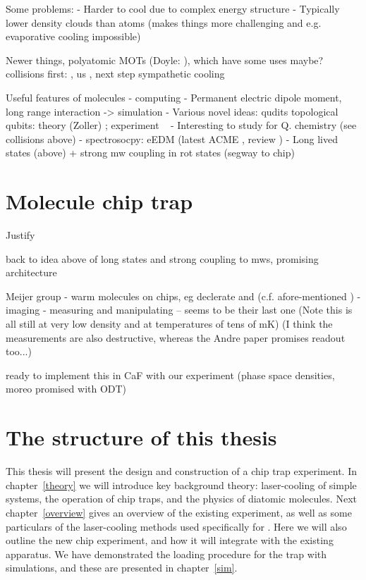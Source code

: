 Some problems:
- Harder to cool due to complex energy structure
- Typically lower density clouds than atoms (makes things more challenging and
e.g. evaporative cooling impossible)

Newer things, polyatomic MOTs (Doyle: \cite{Vilas2021}), which have some uses maybe? ~\cite{DoylePolyatomic2022}
collisions first: \cite{son2019collisional}, us \cite{Jurgilas2021, JurgilasPRL_2021}, next step sympathetic cooling

Useful features of molecules
- computing \cite{PhysRevLett.88.067901}
- Permanent electric dipole moment, long range interaction -> simulation
- Various novel ideas:
   qudits \cite{Sawant_2020}
   topological qubits: theory (Zoller) \cite{Micheli2006};  experiment ~\cite{Gross995}
- Interesting to study for Q. chemistry (see collisions above)
- spectrosocpy: eEDM
(latest ACME \cite{Andreev2018}, review \cite{ACMEreview})
- Long lived states (above) + strong mw coupling in rot states (segway to chip)


\section{Molecule chip trap}

Justify

back to idea above of long states and strong coupling to mws, promising
architecture \cite{Andre2006}

Meijer group
- warm molecules on chips, eg declerate \cite{Meek2008} and \cite{Meek2009}
(c.f. afore-mentioned \cite{Bethlem1999})
- imaging \cite{Marx2013}
- measuring and manipulating \cite{PhysRevA.92.063408} -- seems to be their
last one
(Note this is all still at very low density and at temperatures of tens of mK)
(I think the measurements are also destructive, whereas the Andre paper
promises readout too...)


ready to implement this in CaF with our experiment (phase space densities,
moreo promised with ODT)

\section{The structure of this thesis}

This thesis will present the design and construction of a \CaF{} chip trap
experiment. In chapter~\ref{theory} we will introduce key background theory: 
laser-cooling of simple systems, the operation of chip traps, and the physics
of diatomic molecules. Next chapter~\ref{overview} gives an overview of the
existing \CaF{} experiment, as well as some particulars of the laser-cooling
methods used specifically for \CaF{}. Here we will also outline the new chip
experiment, and how it will integrate with the existing apparatus. We have
demonstrated the loading procedure for the trap with simulations, and these are
presented in chapter~\ref{sim}.

